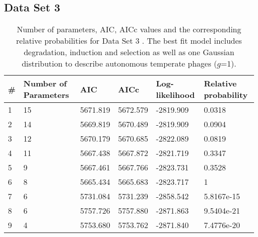 \subsection{Data Set 3}
\begin{table}[hbt!]
\centering
\begin{tabular}{ p{1cm}p{2cm}p{2cm}p{2cm}p{2cm}p{2cm}  }
\hline
\# & Number of Parameters & AIC & AICc& Log-likelihood  & Relative probability \\
\hline

 1&                       15&          5671.819&          5672.579&         -2819.909&        0.0318\\
 2&                       14&          5669.819&          5670.489&         -2819.909&        0.0904\\
 3&                       12&          5670.179&          5670.685&         -2822.089&        0.0819\\
 4&                       11&          5667.438&          5667.872&         -2821.719&          0.3347\\
 5&                        9&          5667.461&          5667.766&         -2823.731&         0.3528\\
 6&                        8&          5665.434&          5665.683&         -2823.717&         1\\
 7&                        6&          5731.084&          5731.239&         -2858.542&      5.8167e-15\\
 8&                        6&          5757.726&          5757.880&         -2871.863&      9.5404e-21\\
 9&                        4&          5753.680&          5753.762&         -2871.840&      7.4776e-20\\
\hline
\end{tabular}
\caption[Number of parameters, AIC, AICc values and the corresponding relative probabilities for Data Set 3.]{Number of parameters, AIC, AICc values and the corresponding relative probabilities for Data Set 3 \citep{leplae_aclame:_2010}. The best fit model includes degradation, induction and selection as well as one Gaussian distribution to describe autonomous temperate phages ($g$=1). }
\label{table:aclame}
\end{table}



